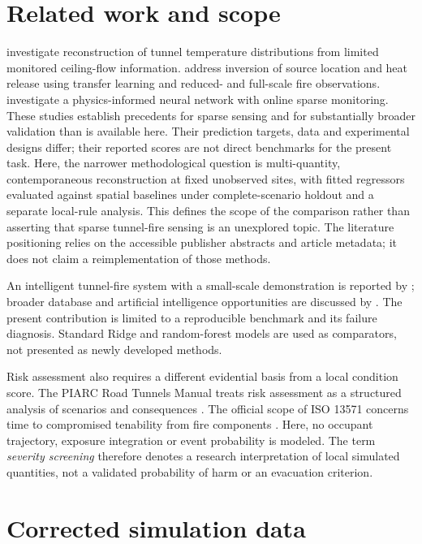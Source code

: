 \documentclass[preprint,12pt,authoryear]{elsarticle}
\begin{document}
\section{Related work and scope}
\citet{Guo2024LimitedTemperature} investigate reconstruction of tunnel
temperature distributions from limited monitored ceiling-flow information.
\citet{Jiang2025TransferTunnel} address inversion of source location and
heat release using transfer learning and reduced- and full-scale fire
observations. \citet{Jiang2026PhysicsInformed} investigate a physics-informed
neural network with online sparse monitoring. These studies establish
precedents for sparse sensing and for substantially broader validation
than is available here. Their prediction targets, data and experimental
designs differ; their reported scores are not direct benchmarks for the
present task. Here, the narrower methodological question is multi-quantity,
contemporaneous reconstruction at fixed unobserved sites, with fitted
regressors evaluated against spatial baselines under complete-scenario
holdout and a separate local-rule analysis. This defines the scope of the
comparison rather than asserting that sparse tunnel-fire sensing is an
unexplored topic. The literature positioning relies on the accessible
publisher abstracts and article metadata; it does not claim a
reimplementation of those methods.

An intelligent tunnel-fire system with a small-scale demonstration is
reported by \citet{Wu2022TunnelFirefighting}; broader database and artificial
intelligence opportunities are discussed by \citet{Zhang2021TunnelDatabase}.
The present contribution is limited to a reproducible benchmark and its
failure diagnosis. Standard Ridge and random-forest models are used as
comparators, not presented as newly developed methods.

Risk assessment also requires a different evidential basis from a local
condition score. The PIARC Road Tunnels Manual treats risk assessment as
a structured analysis of scenarios and consequences
\citep{PIARCRiskAssessment}. The official scope of ISO 13571 concerns time
to compromised tenability from fire components \citep{ISO13571Scope}.
Here, no occupant trajectory, exposure integration or event probability
is modeled. The term \emph{severity screening} therefore denotes a
research interpretation of local simulated quantities, not a validated
probability of harm or an evacuation criterion.

\section{Corrected simulation data}
\end{document}
